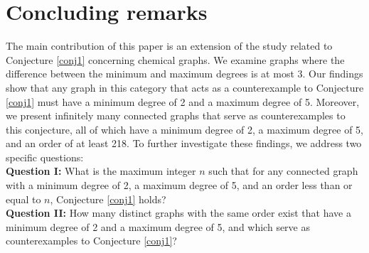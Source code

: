 \documentclass[12pt]{article}
\begin{document}
\section{Concluding remarks}
The main contribution of this paper is an extension of the study related to Conjecture \ref{conj1} concerning chemical graphs. We examine graphs where the difference between the minimum and maximum degrees is at most 3. Our findings show that any graph in this category that acts as a counterexample to Conjecture \ref{conj1} must have a minimum degree of 2 and a maximum degree of 5. Moreover, we present infinitely many connected graphs that serve as counterexamples to this conjecture, all of which have a minimum degree of 2, a maximum degree of 5, and an order of at least 218. To further investigate these findings, we address two specific questions:\\
{\bf Question I:} What is the maximum integer \( n \) such that for any connected graph with a minimum degree of 2, a maximum degree of 5, and an order less than or equal to \( n \), Conjecture \ref{conj1} holds?\\
{\bf Question II:} How many distinct graphs with the same order exist that have a minimum degree of 2 and a maximum degree of 5, and which serve as counterexamples to Conjecture \ref{conj1}?


\end{document}
